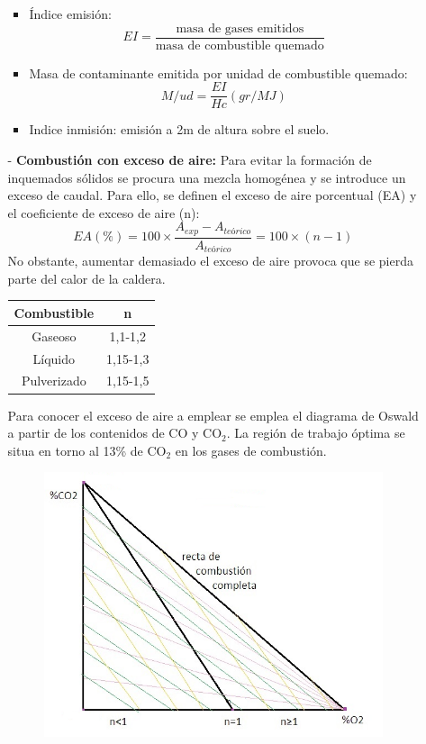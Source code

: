 \begin{enumerate}
\begin{itemize}
			\begin{itemize}
				\item Índice emisión: 
				\[EI=\frac{\text{masa de gases emitidos}}{\text{masa de combustible quemado}}\]
				\item Masa de contaminante emitida por unidad de combustible quemado: 
				\[M/ud= \frac{EI}{Hc} (gr/MJ)\]
				\item Indice inmisión: emisión a 2m de altura sobre el suelo.
			\end{itemize}
			\item [-] \textbf{Combustión con exceso de aire:}
				Para evitar la formación de inquemados sólidos se procura una mezcla homogénea y se introduce un exceso de caudal. Para ello, se definen el exceso de aire porcentual (EA) y el coeficiente de exceso de aire (n):
				\[EA(\%)=100\times\frac{A_{exp}-A_{teórico}}{A_{teórico}}=100\times(n-1)\]
				No obstante, aumentar demasiado el exceso de aire provoca que se pierda parte del calor de la caldera.
				\begin{table}[H]
					\centering
					\renewcommand{\arraystretch}{1.1}
					\begin{tabular}{cc}
						\hline
						\textbf{Combustible}&\textbf{n}\\  
						\hline
						Gaseoso& 1,1-1,2\\
						Líquido & 1,15-1,3\\
						Pulverizado & 1,15-1,5\\ 
						\hline
					\end{tabular}
				\end{table}
				Para conocer el exceso de aire a emplear se emplea el diagrama de Oswald a partir de los contenidos de CO y CO$_2$. La región de trabajo óptima se situa en torno al 13\% de CO$_2$ en los gases de combustión.
				\begin{figure}[H]
					\begin{minipage}{0.6\linewidth}
						\centering
						\includegraphics[width=\linewidth]{res/tema2/oswaldo}

\end{minipage}
\end{figure}
\end{itemize}
\end{enumerate}

